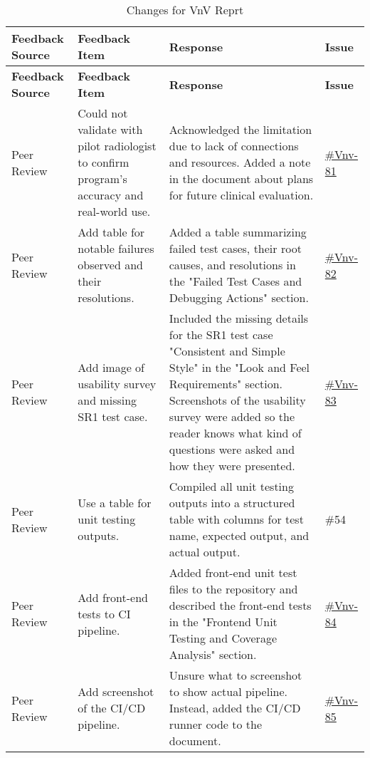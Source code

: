 \documentclass{article}
\begin{document}
\renewcommand{\arraystretch}{1.3}
\begin{longtable}{|p{1.48cm}|p{5cm}|p{4.7cm}|p{1cm}|}
\caption{Changes for VnV Reprt} \\
\hline
\textbf{Feedback Source} & \textbf{Feedback Item} & \textbf{Response} & \textbf{Issue} \\
\hline
\endfirsthead

\hline
\textbf{Feedback Source} & \textbf{Feedback Item} & \textbf{Response} & \textbf{Issue} \\
\hline
\endhead

Peer Review & Could not validate with pilot radiologist to confirm program's accuracy and real-world use. & Acknowledged the limitation due to lack of connections and resources. Added a note in the document about plans for future clinical evaluation. &\href{https://github.com/harrisonchiu/xray/issues/81}{\#Vnv-81}\\
\hline

Peer Review & Add table for notable failures observed and their resolutions. & Added a table summarizing failed test cases, their root causes, and resolutions in the "Failed Test Cases and Debugging Actions" section.&\href{https://github.com/harrisonchiu/xray/issues/82}{\#Vnv-82}\\
\hline

Peer Review & Add image of usability survey and missing SR1 test case. & Included the missing details for the SR1 test case "Consistent and Simple Style" in the "Look and Feel Requirements" section. Screenshots of the usability survey were added so the reader knows what kind of questions were asked and how they were presented.&\href{https://github.com/harrisonchiu/xray/issues/83}{\#Vnv-83}\\
\hline

Peer Review & Use a table for unit testing outputs. & Compiled all unit testing outputs into a structured table with columns for test name, expected output, and actual output. & \#54 \\
\hline

Peer Review & Add front-end tests to CI pipeline. & Added front-end unit test files to the repository and described the front-end tests in the "Frontend Unit Testing and Coverage Analysis" section. &\href{https://github.com/harrisonchiu/xray/issues/84}{\#Vnv-84}\\
\hline

Peer Review & Add screenshot of the CI/CD pipeline. & Unsure what to screenshot to show actual pipeline. Instead, added the CI/CD runner code to the document. &\href{https://github.com/harrisonchiu/xray/issues/85}{\#Vnv-85}\\
\hline


\end{longtable}
\end{document}
